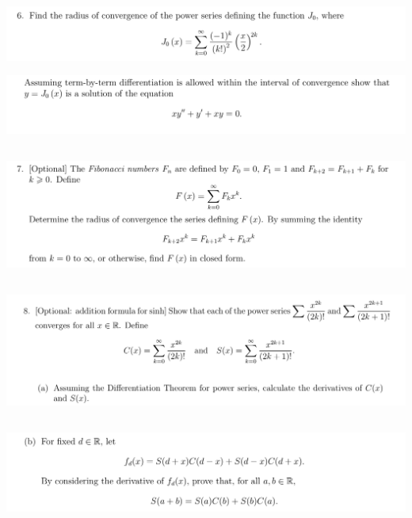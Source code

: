 \documentclass[12pt]{article}
\begin{document}
\newpage
\subsection{}
\begin{mdframed}
\includegraphics[width=400pt]{img/analysis--oxford-M2-I-7-6-a.png}
\end{mdframed}

\begin{mdframed}
\includegraphics[width=400pt]{img/analysis--oxford-M2-I-7-6-b.png}
\end{mdframed}

\newpage
\subsection{}
\begin{mdframed}
\includegraphics[width=400pt]{img/analysis--oxford-M2-I-7-7.png}
\end{mdframed}

\newpage
\subsection{}
\begin{mdframed}
\includegraphics[width=400pt]{img/analysis--oxford-M2-I-7-8-a.png}
\end{mdframed}

\newpage
\subsection{}
\begin{mdframed}
\includegraphics[width=400pt]{img/analysis--oxford-M2-I-7-8-b.png}
\end{mdframed}
\end{document}
